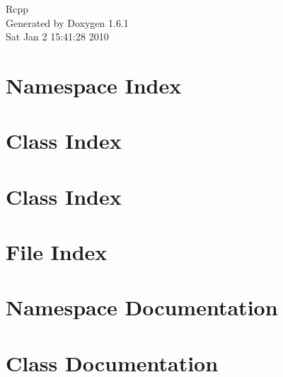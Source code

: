 \documentclass[a4paper]{book}
\begin{document}
\hypersetup{pageanchor=false}
\begin{titlepage}
\vspace*{7cm}
\begin{center}
{\Large Rcpp }\\
\vspace*{1cm}
{\large Generated by Doxygen 1.6.1}\\
\vspace*{0.5cm}
{\small Sat Jan 2 15:41:28 2010}\\
\end{center}
\end{titlepage}
\clearemptydoublepage
{}
\tableofcontents
\clearemptydoublepage
{}
\hypersetup{pageanchor=true}
\chapter{Namespace Index}

\chapter{Class Index}

\chapter{Class Index}

\chapter{File Index}

\chapter{Namespace Documentation}

\chapter{Class Documentation}






















\end{document}
